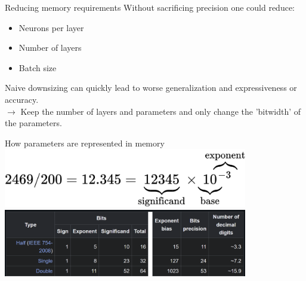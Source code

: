\documentclass[aspectratio=169]{beamer} %
\begin{document}
\begin{frame}{Reducing memory requirements}
  Without sacrificing precision one could reduce:
  \begin{itemize}
    \item Neurons per layer
    \item Number of layers
    \item Batch size
  \end{itemize}
  Naive downsizing can quickly lead to worse generalization and expressiveness or accuracy.\\

  $\rightarrow$ Keep the number of layers and parameters and only change the
  'bitwidth' of the parameters.
\end{frame}

\begin{frame}{How parameters are represented in memory}
\centering
\includegraphics[width=0.8\textwidth]{figures/float.png}
\centering
\includegraphics[width=0.8\textwidth]{figures/binary-formats.png}
\end{frame}
\end{document}
